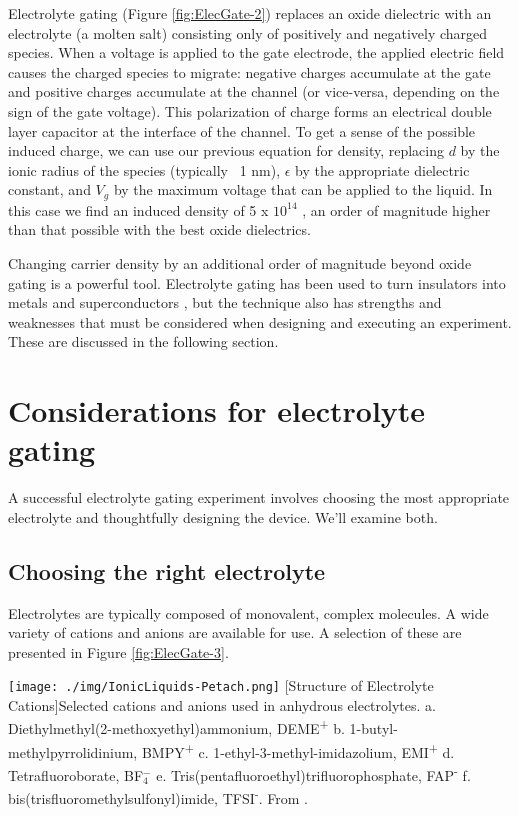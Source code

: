 Electrolyte gating (Figure \ref{fig:ElecGate-2}) replaces an oxide dielectric with an electrolyte (a molten salt) consisting only of positively and negatively charged species. When a voltage is applied to the gate electrode, the applied electric field causes the charged species to migrate: negative charges accumulate at the gate and positive charges accumulate at the channel (or vice-versa, depending on the sign of the gate voltage). This polarization of charge forms an electrical double layer capacitor at the interface of the channel. To get a sense of the possible induced charge, we can use our previous equation for density, replacing $d$ by the ionic radius of the species (typically ~1 nm), $\epsilon$ by the appropriate dielectric constant, and $V_{g}$ by the maximum voltage that can be applied to the liquid. In this case we find an induced density of 5 x $10^{14}$ \percmsq , an order of magnitude higher than that possible with the best oxide dielectrics.

Changing carrier density by an additional order of magnitude beyond oxide gating is a powerful tool. Electrolyte gating has been used to turn insulators into metals \cite{Wang2015} and superconductors \cite{Ueno2008}, but the technique also has strengths and weaknesses that must be considered when designing and executing an experiment. These are discussed in the following section.

\section{Considerations for electrolyte gating}

A successful electrolyte gating experiment involves choosing the most appropriate electrolyte and thoughtfully designing the device. We'll examine both.

\subsection{Choosing the right electrolyte}

Electrolytes are typically composed of monovalent, complex molecules. A wide variety of cations and anions are available for use. A selection of these are presented in Figure \ref{fig:ElecGate-3}.

\begin{centering}
\texttt{[image: ./img/IonicLiquids-Petach.png]}
  \captionsetup{width=0.75\textwidth}
  [Structure of Electrolyte Cations]{Selected cations and anions used in anhydrous electrolytes. a. Diethylmethyl(2-methoxyethyl)ammonium, DEME\textsuperscript{+} b. 1-butyl-methylpyrrolidinium, BMPY\textsuperscript{+} c. 1-ethyl-3-methyl-imidazolium, EMI\textsuperscript{+} d. Tetrafluoroborate, BF$_{4}^{-}$ e. Tris(pentafluoroethyl)trifluorophosphate, FAP\textsuperscript{-} f. bis(trisfluoromethylsulfonyl)imide, TFSI\textsuperscript{-}. From \cite{Petach2017}.} 
  \label{fig:ElecGate-3}
\end{centering}


